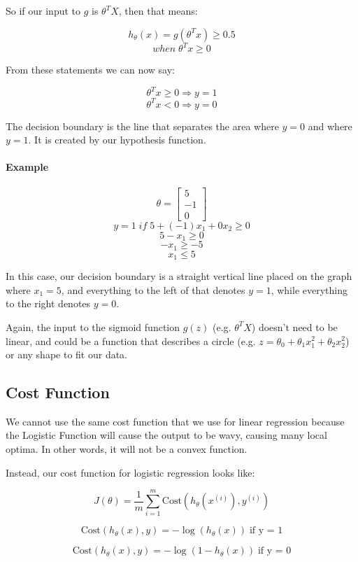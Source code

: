 \documentclass[UTF8]{article}
\begin{document}
So if our input to $g$ is $\theta^TX$, then that means:

\[ h_\theta(x) = g(\theta^T x) \geq 0.5 \]
\[ when \; \theta^T x \geq 0 \]

From these statements we can now say:

\[ \theta^T x \geq 0 \Rightarrow y = 1 \]
\[ \theta^T x < 0 \Rightarrow y = 0 \]

The decision boundary is the line that separates the area where $y = 0$ and where $y = 1$. It is created by our hypothesis function.

\paragraph{Example}

\[ \theta = \begin{bmatrix}5 \\ -1 \\ 0\end{bmatrix} \]
\[ y = 1 \; if \; 5 + (-1) x_1 + 0 x_2 \geq 0 \]
\[ 5 - x_1 \geq 0 \]
\[ - x_1 \geq -5 \]
\[ x_1 \leq 5 \]

In this case, our decision boundary is a straight vertical line placed on the graph where $x_1=5$, and everything to the left of that denotes $y = 1$, while everything to the right denotes $y = 0$.

Again, the input to the sigmoid function $g(z)$ (e.g. $\theta^TX$) doesn't need to be linear, and could be a function that describes a circle (e.g. $z=\theta_0+\theta_1x^2_1+\theta_2x^2_2$) or any shape to fit our data.

\subsection{Cost Function}

We cannot use the same cost function that we use for linear regression because the Logistic Function will cause the output to be wavy, causing many local optima. In other words, it will not be a convex function.

Instead, our cost function for logistic regression looks like:

\[ J(\theta) = \dfrac{1}{m} \sum_{i=1}^m \mathrm{Cost}(h_\theta(x^{(i)}),y^{(i)}) \]

\[ \mathrm{Cost}(h_\theta(x),y) = -\log(h_\theta(x)) \;  \text{if y = 1} \]

\[ \mathrm{Cost}(h_\theta(x),y) = -\log(1-h_\theta(x)) \;  \text{if y = 0} \]
\end{document}
